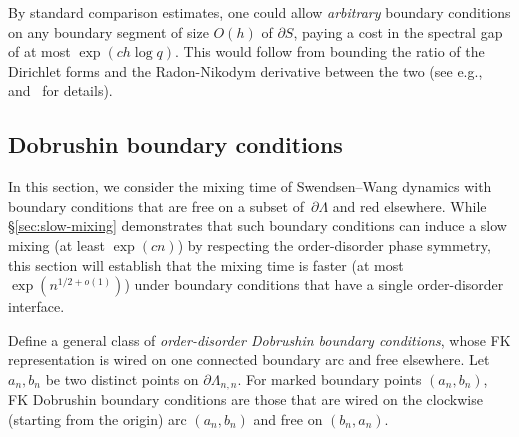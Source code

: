 \documentclass[reqno,11pt]{amsart}
\numberwithin{equation}{section}
\theoremstyle{definition}{
\newtheorem{example}[theorem]{Example}
\newtheorem{definition}[theorem]{Definition}
\newtheorem*{definition*}{Definition}
\newtheorem{problem}[theorem]{Problem}
\newtheorem{question}[theorem]{Question}
\newtheorem{remark}[theorem]{Remark}
}
\begin{document}
\begin{remark}\label{rem:canonical-paths-extension}
By standard comparison estimates, one could allow \emph{arbitrary} boundary conditions on any boundary segment of size $O(h)$ of $\partial S$, paying a cost in the spectral gap of at most $\exp(ch \log q)$. This would follow from bounding the ratio of the Dirichlet forms and the Radon-Nikodym derivative between the two (see e.g.,~\cite[Lemma 2.8]{Martinelli94} and~\cite[Eq.~(5.1)]{GL16a} for details). 
\end{remark}

\subsection{Dobrushin boundary conditions}\label{sub:subexp-wired-free}

In this section, we consider the mixing time of Swendsen--Wang dynamics with boundary conditions that are free on a subset of~$\partial \Lambda$ and red elsewhere. While \S\ref{sec:slow-mixing} demonstrates that such boundary conditions can induce a slow mixing (at least $\exp(c n)$) by respecting the order-disorder phase symmetry, this section will establish that the mixing time is faster (at most $\exp(n^{1/2+o(1)})$) under  boundary conditions that have a single order-disorder interface.

Define a general class of \emph{order-disorder Dobrushin boundary conditions}, whose FK representation is wired on one connected boundary arc and free elsewhere. Let $a_n,b_n$ be two distinct points on $\partial \Lambda_{n,n}$. For marked boundary points $(a_n,b_n)$, FK Dobrushin boundary conditions are those that are wired on the clockwise (starting from the origin) arc $(a_n,b_n)$ and free on $(b_n,a_n)$.
\end{document}
